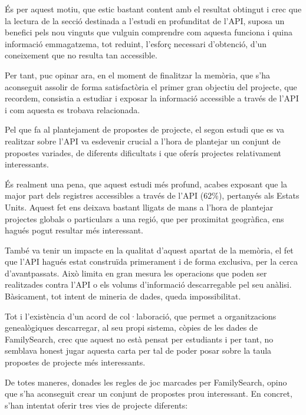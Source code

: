     És per aquest motiu, que estic bastant content amb el resultat obtingut i crec que la lectura de la secció destinada a l’estudi en profunditat de l’API, suposa un benefici pels nou vinguts que vulguin comprendre com aquesta funciona i quina informació emmagatzema, tot reduint, l’esforç necessari d’obtenció, d’un coneixement que no resulta tan accessible.

    Per tant, puc opinar ara, en el moment de finalitzar la memòria, que s’ha aconseguit assolir de forma satisfactòria el primer gran objectiu del projecte, que recordem, consistia a estudiar i exposar la informació accessible a través de l’API i com aquesta es trobava relacionada.

    Pel que fa al plantejament de propostes de projecte, el segon estudi que es va realitzar sobre l’API va esdevenir crucial a l’hora de plantejar un conjunt de propostes variades, de diferents dificultats i que oferís projectes relativament interessants.

    És realment una pena, que aquest estudi més profund, acabes exposant que la major part dels registres accessibles a través de l’API (62\%), pertanyés als Estats Units. Aquest fet ens deixava bastant lligats de mans a l’hora de plantejar projectes globals o particulars a una regió, que per proximitat geogràfica, ens hagués pogut resultar més interessant.

    També va tenir un impacte en la qualitat d’aquest apartat de la memòria, el fet que l’API hagués estat construïda primerament i de forma exclusiva, per la cerca d’avantpassats. Això limita en gran mesura les operacions que poden ser realitzades contra l’API o els volums d’informació descarregable pel seu anàlisi. Bàsicament, tot intent de mineria de dades, queda impossibilitat.

    Tot i l’existència d’un acord de col·laboració, que permet a organitzacions genealògiques descarregar, al seu propi sistema, còpies de les dades de FamilySearch, crec que aquest no està pensat per estudiants i per tant, no semblava honest jugar aquesta carta per tal de poder posar sobre la taula propostes de projecte més interessants.

    De totes maneres, donades les regles de joc marcades per FamilySearch, opino que s’ha aconseguit crear un conjunt de propostes prou interessant. En concret, s’han intentat oferir tres vies de projecte diferents:

